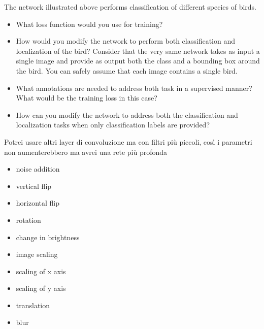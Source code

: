 The network illustrated above performs classification of different species of birds.
\begin{itemize}
    \item What loss function would you use for training?
    \item How would you modify the network to perform both classification and localization of the bird? Consider that the very same network takes as input a single image and provide as output both the class and a bounding box around the bird. You can safely assume that each image contains a single bird.
    \item What annotations are needed to address both task in a supervised manner? What would be the training loss in this case?
    \item How can you modify the network to address both the classification and localization tasks when only classification labels are provided?
\end{itemize}


\begin{box-stud}
    Potrei usare altri layer di convoluzione ma con filtri più piccoli, così i parametri non aumenterebbero ma avrei una rete più profonda
\end{box-stud}


\begin{box-sol}
    \begin{itemize}[label=]
        \item noise addition
        \item[\ok] vertical flip
        \item[\ok] horizontal flip
        \item[\ok] rotation
        \item change in brightness
        \item image scaling
        \item scaling of x axis
        \item scaling of y axis
        \item translation
        \item blur
    \end{itemize}
\end{box-sol}

